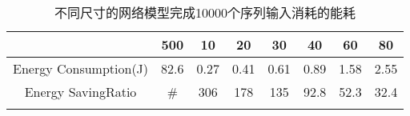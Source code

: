\begin{center}
\begin{table}
	\caption{不同尺寸的网络模型完成10000个序列输入消耗的能耗}
	\renewcommand\arraystretch{1.2}
	\setlength{\tabcolsep}{10pt}
	\begin{tabular}{cccccccc}
	\toprule
		 					&		500		&	10		&	20		&	30		&	40		&	60		&	80		\\	\midrule
	Energy Consumption(J)	&		82.6	&	0.27	&	0.41	&	0.61	&	0.89	&	1.58	&	2.55 \\	\hline
	Energy SavingRatio		&		\#		&	306		&	178		&	135		&	92.8	&	52.3	&	32.4 \\
	\bottomrule
	\label{tab:energy}
	\end{tabular}
\end{table}
\vspace{-3em}
\end{center}

